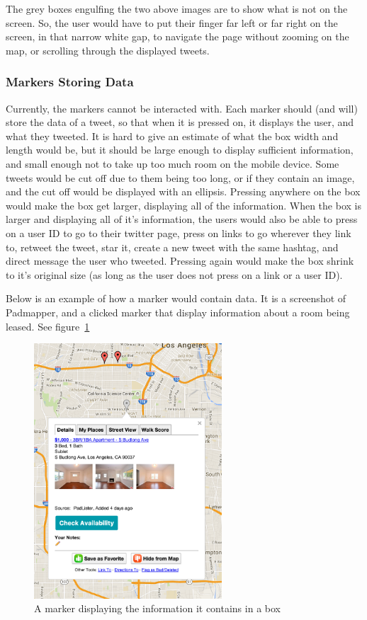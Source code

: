 \documentclass[11pt]{article}
\begin{document}
The grey boxes engulfing the two above images are to show what is not on the screen. So, the user would have to put their finger far left or far right on the screen, in that narrow white gap, to navigate the page without zooming on the map, or scrolling through the displayed tweets.

\subsubsection{Markers Storing Data}
Currently, the markers cannot be interacted with. Each marker should (and will) store the data of a tweet, so that when it is pressed on, it displays the user, and what they tweeted. It is hard to give an estimate of what the box width and length would be, but it should be large enough to display sufficient information, and small enough not to take up too much room on the mobile device. Some tweets would be cut off due to them being too long, or if they contain an image, and the cut off would be displayed with an ellipsis. Pressing anywhere on the box would make the box get larger, displaying all of the information. When the box is larger and displaying all of it's information, the users would also be able to press on a user ID to go to their twitter page, press on links to go wherever they link to, retweet the tweet, star it, create a new tweet with the same hashtag, and direct message the user who tweeted. Pressing again would make the box shrink to it's original size (as long as the user does not press on a link or a user ID).

Below is an example of how a marker would contain data. It is a screenshot of Padmapper, and a clicked marker that display information about a room being leased. See figure~\ref{fig:markerDisplay}

\begin{figure}[H]
    \centering
    \includegraphics[width=7cm]{markerBox}
    \caption{A marker displaying the information it contains in a box}
    \label{fig:markerDisplay}                
\end{figure}
\end{document}
